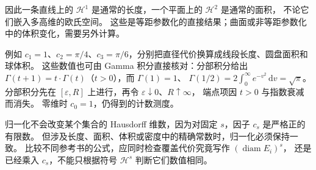 因此一条直线上的 \(\mathcal H^1\) 是通常的长度，一个平面上的 \(\mathcal H^2\) 是通常的面积，
不论它们嵌入多高维的欧氏空间。
这些是等距参数化的直接结果；曲面或非等距参数化中的体积变化，需要另外计算。

\ProseParagraphBreak

例如 \(c_1=1\)、\(c_2=\pi/4\)、\(c_3=\pi/6\)，分别把直径代价换算成线段长度、圆盘面积和球体积。
这些数值也可由 Gamma 积分直接核对：分部积分给出
\(\Gamma(t+1)=t\cdot \Gamma(t)\)（\(t>0\)），而 \(\Gamma(1)=1\)、
\(\Gamma(1/2)=2\int_0^\infty e^{-v^2}\,\mathrm dv=\sqrt\pi\)。
分部积分先在 \([\varepsilon,R]\) 上进行，再令 \(\varepsilon\downarrow0\)、\(R\uparrow\infty\)，
端点项因 \(t>0\) 与指数衰减而消失。
零维时 \(c_0=1\)，仍得到的计数测度。

\ProseParagraphBreak

归一化不会改变某个集合的 Hausdorff 维数，因为对固定 \(s\)，因子 \(c_s\) 是严格正的有限数。
但涉及长度、面积、体积或密度中的精确常数时，归一化必须保持一致。
比较不同参考书的公式，应同时检查覆盖代价究竟写作 \((\operatorname{diam}E_i)^s\)，
还是已经乘入 \(c_s\)，不能只根据符号 \(\mathcal H^s\) 判断它们数值相同。
